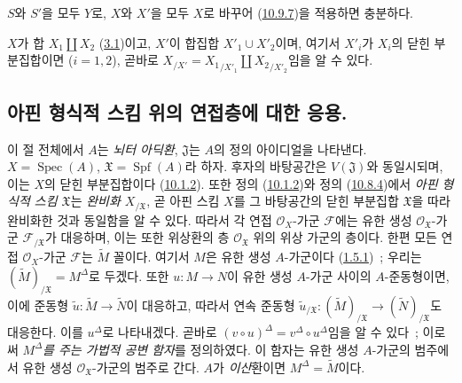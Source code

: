 $S$와 $S'$을 모두 $Y$로, $X$와 $X'$을 모두 $X$로 바꾸어
(\hyperref[I.10.9.7-ko]{10.9.7})을 적용하면 충분하다.

\begin{remark}[10.9.10]
\label{I.10.9.10-ko}
$X$가 합 $X_1\amalg X_2$
(\hyperref[subsection:I.3.1-ko]{3.1})이고, $X'$이 합집합
$X'_1\cup X'_2$이며, 여기서 $X'_i$가 $X_i$의 닫힌 부분집합이면
($i=1,2$), 곧바로
$X_{/X'}={X_1}_{/X'_1}\amalg {X_2}_{/X'_2}$임을 알 수 있다.
\end{remark}

\subsection{아핀 형식적 스킴 위의 연접층에 대한 응용.}
\label{subsection:I.10.10-ko}

\begin{env}[10.10.1]
\label{I.10.10.1-ko}
이 절 전체에서 $A$는 \emph{뇌터 아딕환}, $\mathfrak{J}$는 $A$의
정의 아이디얼을 나타낸다. $X=\operatorname{Spec}(A)$,
$\mathfrak{X}=\operatorname{Spf}(A)$라 하자. 후자의 바탕공간은
$V(\mathfrak{J})$와 동일시되며, 이는 $X$의 닫힌 부분집합이다
(\hyperref[I.10.1.2-ko]{10.1.2}). 또한 정의
(\hyperref[I.10.1.2-ko]{10.1.2})와 정의
(\hyperref[I.10.8.4-ko]{10.8.4})에서 \emph{아핀 형식적 스킴
$\mathfrak{X}$}는 \emph{완비화 $X_{/\mathfrak{X}}$}, 곧 아핀 스킴
$X$를 그 바탕공간의 닫힌 부분집합 $\mathfrak{X}$을 따라 완비화한
것과 동일함을 알 수 있다. 따라서 각 연접 $\mathscr{O}_X$-가군 $\mathscr{F}$에는
유한 생성 $\mathscr{O}_{\mathfrak{X}}$-가군
$\mathscr{F}_{/\mathfrak{X}}$가 대응하며, 이는 또한 위상환의 층
$\mathscr{O}_{\mathfrak{X}}$ 위의 위상 가군의 층이다. 한편 모든 연접
$\mathscr{O}_X$-가군 $\mathscr{F}$는 $\widetilde M$ 꼴이다. 여기서
$M$은 유한 생성 $A$-가군이다
(\hyperref[I.1.5.1-ko]{1.5.1})~; 우리는
$(\widetilde M)_{/\mathfrak{X}}=M^\Delta$로 두겠다. 또한
$u:M\to N$이 유한 생성 $A$-가군 사이의 $A$-준동형이면, 이에
준동형 $\widetilde u:\widetilde M\to\widetilde N$이 대응하고, 따라서
연속 준동형
$\widetilde u_{/\mathfrak{X}}:(\widetilde M)_{/\mathfrak{X}}\to
(\widetilde N)_{/\mathfrak{X}}$도 대응한다. 이를 $u^\Delta$로
나타내겠다. 곧바로
$(v\circ u)^\Delta=v^\Delta\circ u^\Delta$임을 알 수 있다~; 이로써
\emph{$M^\Delta$를 주는 가법적 공변 함자}를 정의하였다. 이 함자는
유한 생성 $A$-가군의 범주에서 유한 생성
$\mathscr{O}_{\mathfrak{X}}$-가군의 범주로 간다. $A$가 \emph{이산}환이면
$M^\Delta=\widetilde M$이다.
\end{env}


